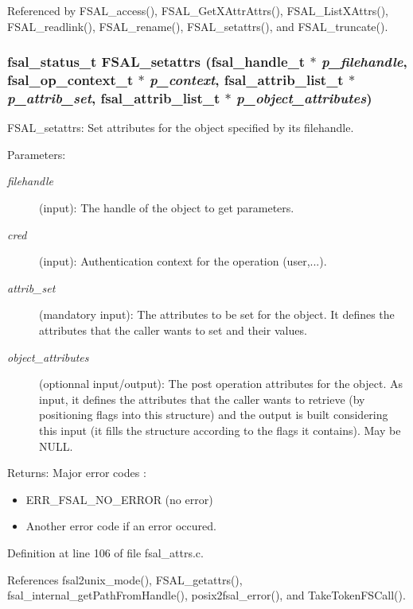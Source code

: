 Referenced by FSAL\_\-access(), FSAL\_\-GetXAttrAttrs(), FSAL\_\-ListXAttrs(), FSAL\_\-readlink(), FSAL\_\-rename(), FSAL\_\-setattrs(), and FSAL\_\-truncate().
\subsubsection[{FSAL\_\-setattrs}]{\setlength{\rightskip}{0pt plus 5cm}fsal\_\-status\_\-t FSAL\_\-setattrs (fsal\_\-handle\_\-t $\ast$ {\em p\_\-filehandle}, \/  fsal\_\-op\_\-context\_\-t $\ast$ {\em p\_\-context}, \/  fsal\_\-attrib\_\-list\_\-t $\ast$ {\em p\_\-attrib\_\-set}, \/  fsal\_\-attrib\_\-list\_\-t $\ast$ {\em p\_\-object\_\-attributes})}\label{fsal__attrs_8c_442cd79a29486ae0adaeefd8a545424a}


FSAL\_\-setattrs: Set attributes for the object specified by its filehandle.

\begin{Desc}
\item[Parameters:]
\begin{description}
\item[{\em filehandle}](input): The handle of the object to get parameters. \item[{\em cred}](input): Authentication context for the operation (user,...). \item[{\em attrib\_\-set}](mandatory input): The attributes to be set for the object. It defines the attributes that the caller wants to set and their values. \item[{\em object\_\-attributes}](optionnal input/output): The post operation attributes for the object. As input, it defines the attributes that the caller wants to retrieve (by positioning flags into this structure) and the output is built considering this input (it fills the structure according to the flags it contains). May be NULL.\end{description}
\end{Desc}
\begin{Desc}
\item[Returns:]Major error codes :\begin{itemize}
\item ERR\_\-FSAL\_\-NO\_\-ERROR (no error)\item Another error code if an error occured. \end{itemize}
\end{Desc}


Definition at line 106 of file fsal\_\-attrs.c.

References fsal2unix\_\-mode(), FSAL\_\-getattrs(), fsal\_\-internal\_\-getPathFromHandle(), posix2fsal\_\-error(), and TakeTokenFSCall().